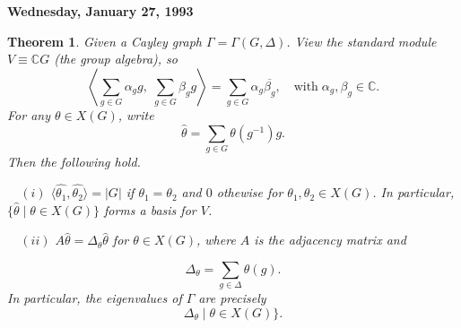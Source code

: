 \documentclass[
]{book}
\newtheorem{theorem}{Theorem}[chapter]
\theoremstyle{definition}
\theoremstyle{definition}
\theoremstyle{definition}
\theoremstyle{definition}
\theoremstyle{remark}
\begin{document}
\textbf{Wednesday, January 27, 1993}

\begin{theorem}
Given a Cayley graph \(\Gamma = \Gamma(G, \Delta)\). View the standard module \(V \equiv \mathbb{C}G\) (the group algebra), so
\[\left\langle \sum_{g\in G}\alpha_g g, \;\sum_{g\in G}\beta_g g\right\rangle = \sum_{g\in G}\alpha_g\overline{\beta_g}, \quad \textrm{with}\; \alpha_g, \beta_g\in \mathbb{C}.\]
For any \(\theta\in X(G)\), write
\[\hat{\theta} = \sum_{g\in G}\theta(g^{-1})g.\]
Then the following hold.

~~\((i)\) \(\langle \hat{\theta_1}, \hat{\theta_2}\rangle = |G|\) if \(\theta_1 = \theta_2\) and \(0\) othewise for \(\theta_1, \theta_2\in X(G)\). In particular, \(\{\hat{\theta}\mid \theta\in X(G)\}\) forms a basis for \(V\).

~~\((ii)\) \(A\hat{\theta} = \Delta_\theta \hat{\theta}\) for \(\theta \in X(G)\), where \(A\) is the adjacency matrix and

\[\Delta_\theta = \sum_{g\in \Delta}\theta(g).\]
In particular, the eigenvalues of \(\Gamma\) are precisely
\[\Delta_\theta \mid \theta\in X(G)\}.\]
\end{theorem}
\end{document}
